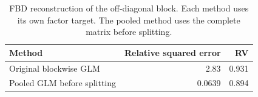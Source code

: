 \begin{table}[ht]
\centering
\caption{FBD reconstruction of the off-diagonal block. Each method uses its own factor target. The pooled method uses the complete matrix before splitting.}
\label{tab:fbd-comparison}
\begin{tabular}{lrr}
\hline
Method & Relative squared error & RV \\
\hline
Original blockwise GLM & 2.83 & 0.931 \\
Pooled GLM before splitting & 0.0639 & 0.894 \\
\hline
\end{tabular}
\end{table}

